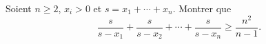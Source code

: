 Soient $n \geq 2$, $x_i > 0$ et $s = x_1 + \cdots + x_n$. Montrer que
\[ \frac{s}{s - x_1} + \frac{s}{s - x_2} + \cdots + \frac{s}{s - x_n} \geq \frac{n^2}{n - 1}. \]
